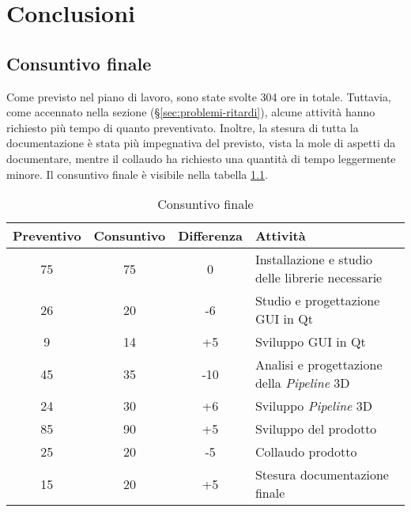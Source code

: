 
\chapter{Conclusioni}
\label{cap:conclusioni}

\section{Consuntivo finale}
Come previsto nel piano di lavoro, sono state svolte 304 ore in totale. Tuttavia, come accennato nella sezione  (§\ref{sec:problemi-ritardi}), alcune attività hanno richiesto più tempo di quanto preventivato. Inoltre, la stesura di tutta la documentazione è stata più impegnativa del previsto, vista la mole di aspetti da documentare, mentre il collaudo ha richiesto una quantità di tempo leggermente minore. Il consuntivo finale è visibile nella tabella \ref{table:consuntivo-finale}.

\begin{center}
    \begin{table}[h]
    \def\arraystretch{1.5}
    \setlength\extrarowheight{5pt}
    \begin{tabular}{| c | c | c | p{5cm} |}
        \hline
        \textbf{Preventivo} & \textbf{Consuntivo} & \textbf{Differenza} & \textbf{Attività} \\ \hline  
        75 & 75 & 0 & Installazione e studio delle librerie necessarie\\ \hline
        26 & 20 & -6 & Studio e progettazione GUI in Qt\\ \hline
        9 & 14 & +5 & Sviluppo GUI in Qt\\ \hline
        45 & 35 & -10 & Analisi e progettazione della \emph{Pipeline} 3D\\ \hline
        24 & 30 & +6 & Sviluppo \emph{Pipeline} 3D\\ \hline
        85 & 90 & +5 & Sviluppo del prodotto\\ \hline
        25 & 20 & -5 & Collaudo prodotto\\ \hline
        15 & 20 & +5 & Stesura documentazione finale\\ \hline
    \end{tabular}
    \caption{Consuntivo finale}
    \label{table:consuntivo-finale}
    \end{table}
\end{center}


